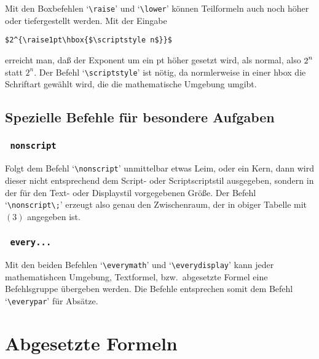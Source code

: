 Mit den 
Boxbefehlen 
`\verb|\raise|' und 
`\verb|\lower|' k\"onnen
Teilformeln auch noch h\"oher oder tiefergestellt werden. Mit der
Eingabe
\begin{verbatim}
$2^{\raise1pt\hbox{$\scriptstyle n$}}$
\end{verbatim}
erreicht man, da\ss{} der Exponent um ein pt h\"oher gesetzt wird, als
normal, also $2^{\raise1pt\hbox{$\scriptstyle n$}}$ statt $2^n$. Der
Befehl `\verb|\scriptstyle|' ist n\"otig, da normlerweise in einer hbox
die 
Schriftart gew\"ahlt wird, die die mathematische Umgebung umgibt.

\subsection{Spezielle Befehle f\"ur besondere Aufgaben}
\subsubsection{\tt{} nonscript}
Folgt dem Befehl 
`\verb|\nonscript|' unmittelbar etwas 
Leim, oder ein
Kern, dann wird dieser nicht entsprechend dem Script- oder
Scriptscriptstil ausgegeben, sondern in der f\"ur den Text- oder
Displaystil vorgegebenen Gr\"o\ss{}e. Der Befehl `\verb|\nonscript\;|'
erzeugt also genau den 
Zwischenraum, der in obiger Tabelle mit $(3)$
angegeben ist.
\subsubsection{\tt{} every...}
Mit den beiden Befehlen 
`\verb|\everymath|' und
`\verb|\everydisplay|'
kann jeder mathematishcen Umgebung, Textformel, bzw.\
abgesetzte
Formel eine Befehlsgruppe \"ubergeben werden. Die Befehle entsprechen
somit dem Befehl \index{zzzeverypar@{\tt\char92 everypar}}
`\verb|\everypar|' f\"ur Abs\"atze.
\section{Abgesetzte Formeln}
